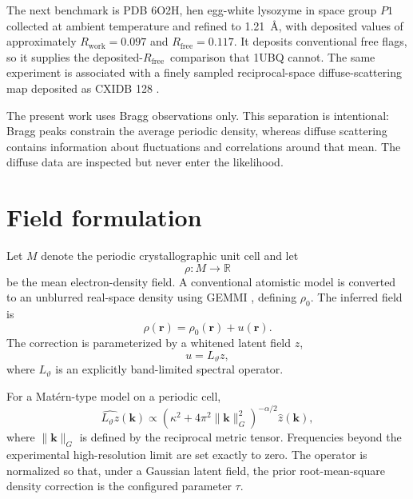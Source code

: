 \documentclass[11pt]{article}
\newcommand{\Rwork}{\ensuremath{R_{\mathrm{work}}}}
\newcommand{\Rfree}{\ensuremath{R_{\mathrm{free}}}}
\newcommand{\rhozero}{\ensuremath{\rho_0}}
\begin{document}
The next benchmark is PDB 6O2H, hen egg-white lysozyme in space group $P1$ collected at
ambient temperature and refined to 1.21~\AA, with deposited values of approximately
$\Rwork=0.097$ and $\Rfree=0.117$. It deposits conventional free flags, so it supplies the
deposited-\Rfree\ comparison that 1UBQ cannot. The same experiment is associated with a finely
sampled reciprocal-space diffuse-scattering map deposited as CXIDB 128 \cite{meisburger2020}.

The present work uses Bragg observations only. This separation is intentional: Bragg peaks
constrain the average periodic density, whereas diffuse scattering contains information about
fluctuations and correlations around that mean. The diffuse data are inspected but never
enter the likelihood.

\section{Field formulation}
\label{sec:field}
Let $M$ denote the periodic crystallographic unit cell and let
\begin{equation}
  \rho:M\rightarrow\mathbb R
\end{equation}
be the mean electron-density field. A conventional atomistic model is converted to an unblurred real-space density using GEMMI \cite{wojdyr2022}, defining $\rhozero$. The inferred field is
\begin{equation}
  \boxed{\rho(\mathbf r)=\rhozero(\mathbf r)+u(\mathbf r)}.
\end{equation}
The correction is parameterized by a whitened latent field $z$,
\begin{equation}
  u=L_{\vartheta}z,
\end{equation}
where $L_{\vartheta}$ is an explicitly band-limited spectral operator.

For a Mat\'ern-type model on a periodic cell,
\begin{equation}
  \widehat{L_{\vartheta}z}(\mathbf k)
  \propto
  \left(\kappa^2+4\pi^2\lVert\mathbf k\rVert_G^2\right)^{-\alpha/2}
  \hat z(\mathbf k),
\end{equation}
where $\lVert\mathbf k\rVert_G$ is defined by the reciprocal metric tensor. Frequencies beyond the experimental high-resolution limit are set exactly to zero. The operator is normalized so that, under a Gaussian latent field, the prior root-mean-square density correction is the configured parameter $\tau$.
\end{document}
